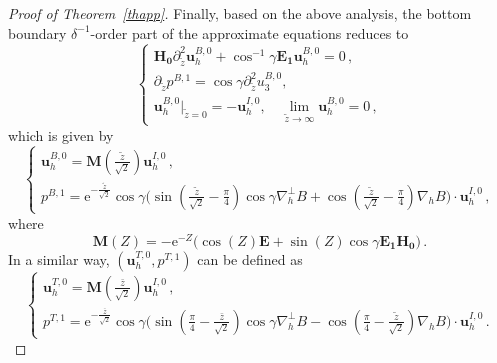 \documentclass[pdflatex,sn-mathphys-num]{sn-jnl}%
\theoremstyle{thmstyleone}%
\theoremstyle{thmstyletwo}%
\theoremstyle{thmstylethree}%
\theoremstyle{thmstyletwo}
\begin{document}
\begin{proof}[Proof of Theorem~{\upshape\ref{thapp}}]
Finally, based on the above analysis, the bottom boundary $\delta^{-1}$-order part of the approximate equations reduces to
\begin{equation*}
	\begin{cases}	
		\boldsymbol{H_0} \partial_{\tilde z}^2\boldsymbol u_h^{B,0}+\cos^{-1}\gamma\boldsymbol{E_1}\boldsymbol u_h^{B,0}=0\,,\\
		\partial_{\tilde{z}}p^{B,1}=\cos\gamma\partial_{\tilde{z}}^2 u_3^{B,0},\\
		\boldsymbol u^{B,0}_h|_{\tilde z=0}=-\boldsymbol{u}^{I,0}_h,\quad
		\lim\limits_{\tilde{z}\rightarrow \infty}\boldsymbol u^{B,0}_h=0\,,
	\end{cases}
\end{equation*}
which is given by
\begin{equation}\label{2.15}
	\begin{cases}
		\boldsymbol u_h^{B,0}=\boldsymbol{M}(\tfrac{\tilde z}{\sqrt 2})
		\boldsymbol{u}^{I,0}_h\,,\\
		p^{B,1}=\mathrm{e}^{-\frac{\tilde z}{\sqrt 2}}\cos\gamma\big( \sin(\tfrac{\tilde z}{\sqrt 2}-\tfrac\pi4)\cos\gamma\nabla^\perp_h B
		+\cos(\tfrac{\tilde z}{\sqrt 2}-\tfrac\pi4)\nabla_hB\big)\cdot\boldsymbol{u}^{I,0}_h\,,
	\end{cases}
\end{equation}
where
\begin{equation*}
	\boldsymbol{M}(Z)=
	-\mathrm{e}^{-Z}
	\Big(
	\cos(Z)\boldsymbol{E}+\sin(Z)\cos\gamma\boldsymbol{E_1}\boldsymbol{H_0}
	\Big)\,.
\end{equation*}
In a similar way, $(\boldsymbol{u}^{T,0}_h,p^{T,1})$ can be defined as
\begin{equation}\label{2.16}
	\begin{cases}
		\boldsymbol u_h^{T,0}=\boldsymbol{M}(\tfrac{\bar z}{\sqrt 2})
		\boldsymbol{u}^{I,0}_h\,,\\
		p^{T,1}=\mathrm{e}^{-\frac{\bar z}{\sqrt 2}}\cos\gamma
		\big( 
		\sin(\tfrac\pi4-\tfrac{\bar z}{\sqrt 2})\cos\gamma\nabla^\perp_h B
		-\cos(\tfrac\pi4-\tfrac{\tilde z}{\sqrt 2})\nabla_hB\big)\cdot\boldsymbol{u}^{I,0}_h\,.
	\end{cases}
\end{equation}







\end{proof}
\end{document}
